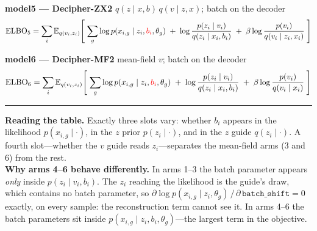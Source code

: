 \documentclass[12pt]{article}
\newcommand{\ELBO}[1]{\mathrm{ELBO}_{#1}}
\begin{document}
\vspace{4pt}
\textbf{model5 \;---\; Decipher-ZX2} \hfill {\small $q(z\mid x,b)\,q(v\mid z,x)$; batch on the decoder}
\begin{equation*}
\ELBO{5} = \sum_i \mathbb{E}_{q(v_i,z_i)}\!\left[\;
\sum_g \log p(x_{i,g}\mid z_i,\textcolor{red}{b_i},\theta_g)
\;+\; \log\frac{p(z_i\mid v_i)}{q(z_i\mid x_i,b_i)}
\;+\; \beta\log\frac{p(v_i)}{q(v_i\mid z_i,x_i)}
\;\right]
\end{equation*}

\vspace{4pt}
\textbf{model6 \;---\; Decipher-MF2} \hfill {\small mean-field $v$; batch on the decoder}
\begin{equation*}
\ELBO{6} = \sum_i \mathbb{E}_{q(v_i,z_i)}\!\left[\;
\sum_g \log p(x_{i,g}\mid z_i,\textcolor{red}{b_i},\theta_g)
\;+\; \log\frac{p(z_i\mid v_i)}{q(z_i\mid x_i,b_i)}
\;+\; \beta\log\frac{p(v_i)}{q(v_i\mid x_i)}
\;\right]
\end{equation*}

\vspace{16pt}
\hrule
\vspace{8pt}
{\small
\textbf{Reading the table.} Exactly three slots vary: whether $b_i$ appears in the
likelihood $p(x_{i,g}\mid\cdot)$, in the $z$ prior $p(z_i\mid\cdot)$, and in the
$z$ guide $q(z_i\mid\cdot)$. A fourth slot---whether the $v$ guide reads $z_i$---separates
the mean-field arms (3 and 6) from the rest.\\[6pt]
\textbf{Why arms 4--6 behave differently.} In arms 1--3 the batch parameter appears
\emph{only} inside $p(z_i\mid v_i,b_i)$. The $z_i$ reaching the likelihood is the guide's
draw, which contains no batch parameter, so
$\partial \log p(x_{i,g}\mid z_i,\theta_g)\,/\,\partial\,\texttt{batch\_shift} = 0$
exactly, on every sample: the reconstruction term cannot see it. In arms 4--6 the batch
parameters sit inside $p(x_{i,g}\mid z_i,b_i,\theta_g)$---the largest term in the objective.}
\end{document}
